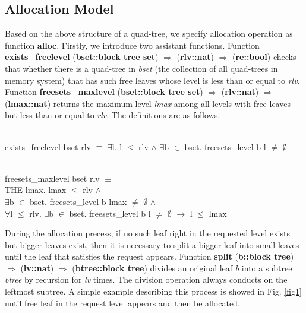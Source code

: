 \subsection{Allocation Model}
Based on the above structure of a quad-tree, we specify allocation operation as function \textbf{alloc}. Firstly, we introduce two assistant functions. Function \textbf{exists\_freelevel} (\textbf{bset::block tree set}) $\Rightarrow$ (\textbf{rlv::nat}) $\Rightarrow$ (\textbf{re::bool}) checks that whether there is a quad-tree in \emph{bset} (the collection of all quad-trees in memory system) that has such free leaves whose level is less than or equal to \emph{rlv}. Function \textbf{freesets\_maxlevel} (\textbf{bset::block tree set}) $\Rightarrow$ (\textbf{rlv::nat}) $\Rightarrow$ (\textbf{lmax::nat}) returns the maximum level \emph{lmax} among all levels with free leaves but less than or equal to \emph{rlv}. The definitions are as follows.

\begin{definition}  \\
	exists\_freelevel bset rlv $\equiv$ $\exists$l. l $\leq$ rlv $\wedge$ $\exists$b $\in$ bset. freesets\_level b l $\ne$ $\emptyset$
\end{definition}

\begin{definition}  \\
	freesets\_maxlevel bset rlv $\equiv$ \\
	\phantom{x} \hspace{10pt} THE lmax. lmax $\leq$ rlv $\wedge$ \\
	\phantom{x} \hspace{60pt} $\exists$b $\in$ bset. freesets\_level b lmax $\neq$ $\emptyset$ $\wedge$ \\
	\phantom{x} \hspace{60pt} $\forall$l $\leq$ rlv. $\exists$b $\in$ bset. freesets\_level b l $\ne$ $\emptyset$ $\longrightarrow$ l $\leq$ lmax
\end{definition}

During the allocation precess, if no such leaf right in the requested level exists but bigger leaves exist, then it is necessary to split a bigger leaf into small leaves until the leaf that satisfies the request appears. Function \textbf{split} (\textbf{b::block tree}) $\Rightarrow$ (\textbf{lv::nat}) $\Rightarrow$ (\textbf{btree::block tree}) divides an original leaf \emph{b} into a subtree \emph{btree} by recursion for \emph{lv} times. The division operation always conducts on the leftmost subtree. A simple example describing this process is showed in Fig. \ref{fig1} until free leaf in the request level appears and then be allocated.

